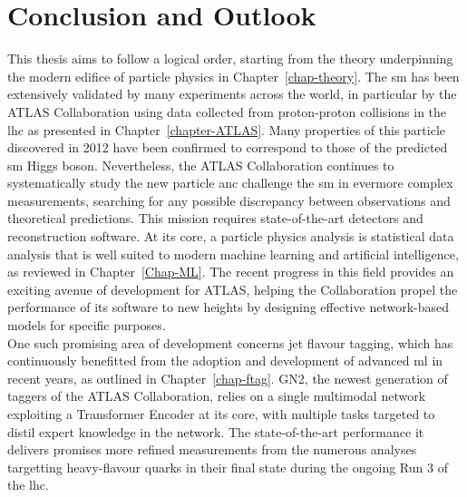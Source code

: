 \chapter{\color{oxfordblue} Conclusion and Outlook}\label{chap-Conclusion}
\ChapFrame
\vspace{-1cm}
This thesis aims to follow a logical order, starting from the theory underpinning the modern edifice of particle physics in Chapter~\ref{chap-theory}. The \gls{sm} has been extensively validated by many experiments across the world, in particular by the ATLAS Collaboration using data collected from proton-proton collisions in the \gls{lhc} as presented in Chapter~\ref{chapter-ATLAS}. Many properties of this particle discovered in 2012 have been confirmed to correspond to those of the predicted \gls{sm} Higgs boson. Nevertheless, the ATLAS Collaboration continues to systematically study the new particle anc challenge the \gls{sm} in evermore complex measurements, searching for any possible discrepancy between observations and theoretical predictions. This mission requires state-of-the-art detectors and reconstruction software. At its core, a particle physics analysis is statistical data analysis that is well suited to modern machine learning and artificial intelligence, as reviewed in Chapter~\ref{Chap-ML}. The recent progress in this field provides an exciting avenue of development for ATLAS, helping the Collaboration propel the performance of its software to new heights by designing effective network-based models for specific purposes. \\

One such promising area of development concerns jet flavour tagging, which has continuously benefitted from the adoption and development of advanced \gls{ml} in recent years, as outlined in Chapter~\ref{chap-ftag}. GN2, the newest generation of taggers of the ATLAS Collaboration, relies on a single multimodal network exploiting a Transformer Encoder at its core, with multiple tasks targeted to distil expert knowledge in the network. The state-of-the-art performance it delivers promises more refined measurements from the numerous analyses targetting heavy-flavour quarks in their final state during the ongoing Run 3 of the \gls{lhc}. \\

